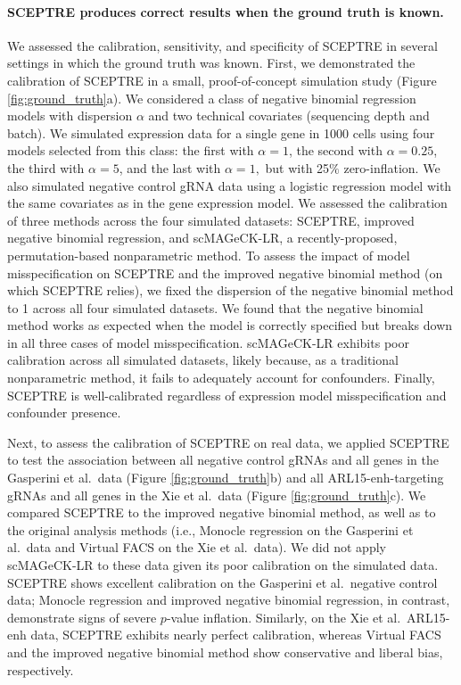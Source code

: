 \documentclass{nature}
\begin{document}
\paragraph{SCEPTRE produces correct results when the ground truth is known.} 

We assessed the calibration, sensitivity, and specificity of SCEPTRE in several settings in which the ground truth was known. First, we demonstrated the calibration of SCEPTRE in a small, proof-of-concept simulation study (Figure \ref{fig:ground_truth}a). We considered a class of negative binomial regression models with dispersion $\alpha$ and two technical covariates (sequencing depth and batch). We simulated expression data for a single gene in 1000 cells using four models selected from this class: the first with $\alpha = 1$, the second with $\alpha = 0.25$, the third with $\alpha = 5$, and the last with $\alpha = 1,$ but with 25$\%$ zero-inflation. We also simulated negative control gRNA data using a logistic regression model with the same covariates as in the gene expression model. We assessed the calibration of three methods across the four simulated datasets: SCEPTRE, improved negative binomial regression, and scMAGeCK-LR,\cite{Yang2020} a recently-proposed, permutation-based nonparametric method. To assess the impact of model misspecification on SCEPTRE and the improved negative binomial method (on which SCEPTRE relies), we fixed the dispersion of the negative binomial method to 1 across all four simulated datasets. We found that the negative binomial method works as expected when the model is correctly specified but breaks down in all three cases of model misspecification. scMAGeCK-LR exhibits poor calibration across all simulated datasets, likely because, as a traditional nonparametric method, it fails to adequately account for confounders. Finally, SCEPTRE is well-calibrated regardless of expression model misspecification and confounder presence.

Next, to assess the calibration of SCEPTRE on real data, we applied SCEPTRE to test the association between all negative control gRNAs and all genes in the Gasperini et al.\ data (Figure \ref{fig:ground_truth}b) and all ARL15-enh-targeting gRNAs and all genes in the Xie et al.\ data (Figure \ref{fig:ground_truth}c). We compared SCEPTRE to the improved negative binomial method, as well as to the original analysis methods (i.e., Monocle regression on the Gasperini et al.\ data and Virtual FACS on the Xie et al.\ data). We did not apply scMAGeCK-LR to these data given its poor calibration on the simulated data. SCEPTRE shows excellent calibration on the Gasperini et al.\ negative control data; Monocle regression and improved negative binomial regression, in contrast, demonstrate signs of severe $p$-value inflation. Similarly, on the Xie et al.\ ARL15-enh data, SCEPTRE exhibits nearly perfect calibration, whereas Virtual FACS and the improved negative binomial method show conservative and liberal bias, respectively.
\end{document}
